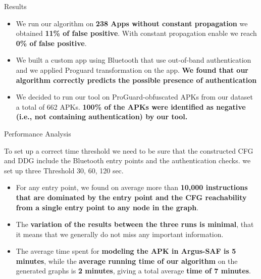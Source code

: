 \documentclass[10pt]{beamer}
\begin{document}
\begin{frame}[fragile]{Results}

\begin{itemize}

\item We run our algorithm on {\bf 238 Apps without constant
    propagation} we obtained {\bf 11\% of false positive}. With
  constant propagation enable we reach {\bf 0\% of false positive}.

\item We built a custom app using Bluetooth that use out-of-band
  authentication and we applied Proguard transformation on the
  app. {\bf We found that our algorithm correctly predicts the
    possible presence of authentication}

\item We decided to run our tool on ProGuard-obfuscated APKs from our
  dataset a total of 662 APKs. {\bf 100\% of the APKs were identified
    as negative (i.e., not containing authentication) by our tool.}
  

\end{itemize}

\end{frame}

\begin{frame}[fragile]{Performance Analysis}

  To set up a correct time threshold we need to be sure that the
  constructed CFG and DDG include the Bluetooth entry points and the
  authentication checks. we set up three Threshold 30, 60, 120 sec.
  
\begin{itemize}

\item For any entry point, we found on average more than {\bf 10,000
    instructions that are dominated by the entry point and the CFG
    reachability from a single entry point to any node in the graph}.
  
\item The {\bf variation of the results between the three runs is
    minimal}, that it means that we generally do not miss any
  important information.
  
\item The average time spent for {\bf modeling the APK in Argus-SAF is
    5 minutes}, while the {\bf average running time of our algorithm}
  on the generated graphs is {\bf 2 minutes}, giving a total average
  {\bf time of 7 minutes}.
  
\end{itemize}

\end{frame}
\end{document}
